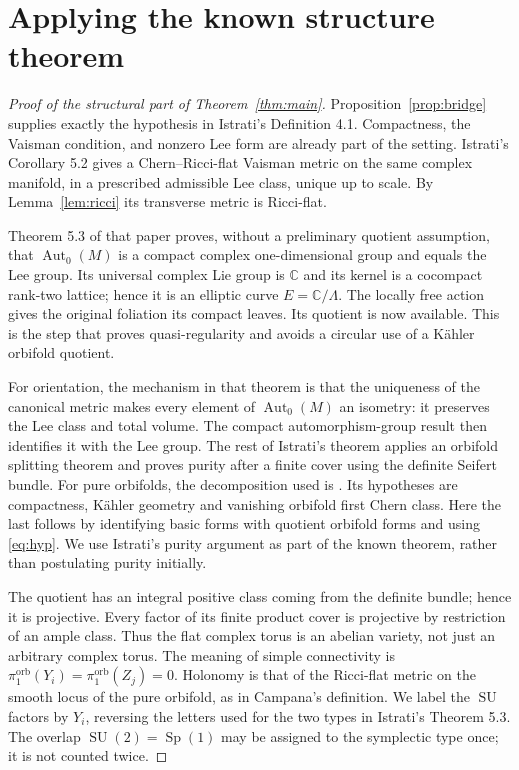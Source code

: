 \documentclass[12pt]{amsart}
\theoremstyle{definition}
\theoremstyle{remark}
\numberwithin{equation}{section}
\DeclareMathOperator{\Autop}{Aut}
\newcommand{\orb}{\mathrm{orb}}
\newcommand{\C}{\mathbb{C}}
\newcommand{\SU}{\operatorname{SU}}
\newcommand{\Sp}{\operatorname{Sp}}
\begin{document}
\section{Applying the known structure theorem}\label{sec:structure}
\begin{proof}[Proof of the structural part of Theorem~\ref{thm:main}]
Proposition~\ref{prop:bridge} supplies exactly the hypothesis in Istrati's
Definition 4.1. Compactness, the Vaisman condition, and nonzero Lee form
are already part of the setting. Istrati's Corollary 5.2 gives a
Chern--Ricci-flat Vaisman metric on the same complex manifold, in a
prescribed admissible Lee class, unique up to scale. By
Lemma~\ref{lem:ricci} its transverse metric is Ricci-flat.

Theorem 5.3 of that paper proves, without a preliminary quotient
assumption, that $\Autop_0(M)$ is a compact complex one-dimensional group
and equals the Lee group. Its universal complex Lie group is $\C$ and
its kernel is a cocompact rank-two lattice; hence it is an elliptic curve
$E=\C/\Lambda$. The locally free action gives the original foliation
its compact leaves. Its quotient is now available. This is the step
that proves quasi-regularity and avoids a circular use of a K\"ahler
orbifold quotient.

For orientation, the mechanism in that theorem is that the uniqueness
of the canonical metric makes every element of $\Autop_0(M)$ an
isometry: it preserves the Lee class and total volume. The compact
automorphism-group result then identifies it with the Lee group. The
rest of Istrati's theorem applies an orbifold splitting theorem and
proves purity after a finite cover using the definite Seifert bundle.
For pure orbifolds, the decomposition used is
\cite[Theorem 6.4 and Definition 6.5]{Campana}. Its hypotheses are
compactness, K\"ahler geometry and vanishing orbifold first Chern class.
Here the last follows by identifying basic forms with quotient
orbifold forms and using \eqref{eq:hyp}. We use Istrati's purity argument
as part of the known theorem, rather than postulating purity initially.

The quotient has an integral positive class coming from the definite
bundle; hence it is projective. Every factor of its finite product
cover is projective by restriction of an ample class. Thus the flat
complex torus is an abelian variety, not just an arbitrary complex
torus. The meaning of simple connectivity is
$\pi_1^{\orb}(Y_i)=\pi_1^{\orb}(Z_j)=0$. Holonomy is that of the
Ricci-flat metric on the smooth locus of the pure orbifold, as in
Campana's definition. We label the $\SU$ factors by $Y_i$, reversing
the letters used for the two types in Istrati's Theorem 5.3.
The overlap $\SU(2)=\Sp(1)$ may be assigned to the symplectic type once;
it is not counted twice.


\end{proof}
\end{document}
